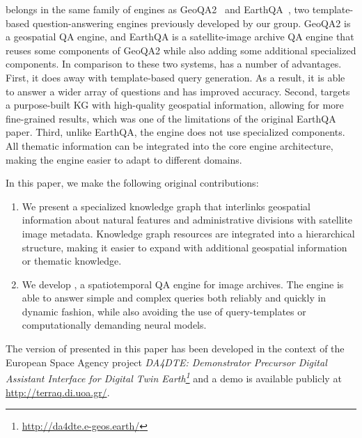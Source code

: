 \EngineName{} belongs in the same family of engines as GeoQA2~\cite{geoqa2} and EarthQA~\cite{earthqa}, two template-based question-answering engines previously developed by our group. GeoQA2 is a geospatial QA engine, and EarthQA is a satellite-image archive QA engine that reuses some components of GeoQA2 while also adding some additional specialized components. In comparison to these two systems, \EngineName{} has a number of advantages. First, it does away with template-based query generation. 
As a result, it is able to answer a wider array of questions and has improved accuracy. Second, \EngineName{} targets a purpose-built KG with high-quality geospatial information, allowing for more fine-grained results, which was one of the limitations of the original EarthQA paper. Third, unlike EarthQA, the engine does not use specialized components. All thematic information can be integrated into the core engine architecture, making the engine easier to adapt to different domains.

In this paper, we make the following original contributions:
\begin{enumerate}
    \item We present a specialized knowledge graph that interlinks geospatial information about natural features and administrative divisions with satellite image metadata. Knowledge graph resources are integrated into a hierarchical structure, making it easier to expand with additional geospatial information or thematic knowledge.
    \item We develop \EngineName{}, a spatiotemporal QA engine for image archives. The engine is able to answer simple and complex queries both reliably and quickly in dynamic fashion, while also avoiding the use of query-templates or computationally demanding neural models. 
\end{enumerate}

The version of \EngineName{} presented in this paper has been developed in the context of the European Space Agency project \textit{DA4DTE: Demonstrator Precursor Digital Assistant Interface for Digital Twin Earth\footnote{\url{http://da4dte.e-geos.earth/}}} and a demo is available publicly at {\url{http://terraq.di.uoa.gr/}}.

